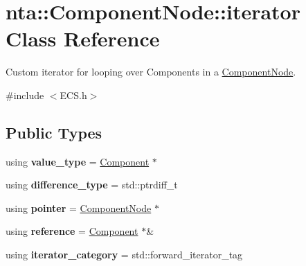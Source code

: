 \hypertarget{classnta_1_1ComponentNode_1_1iterator}{}\section{nta\+:\+:Component\+Node\+:\+:iterator Class Reference}
\label{classnta_1_1ComponentNode_1_1iterator}


Custom iterator for looping over Components in a \hyperlink{structnta_1_1ComponentNode}{Component\+Node}.  




{\ttfamily \#include $<$E\+C\+S.\+h$>$}

\subsection*{Public Types}
\begin{DoxyCompactItemize}
\item 
\mbox{\label{classnta_1_1ComponentNode_1_1iterator_a069cb5918a7ebfbc37af0386e66ff3c0}} 
using {\bfseries value\+\_\+type} = \hyperlink{classnta_1_1Component}{Component} $\ast$
\item 
\mbox{\label{classnta_1_1ComponentNode_1_1iterator_abcd9c1a5a2386266a22f81a6f0ce49aa}} 
using {\bfseries difference\+\_\+type} = std\+::ptrdiff\+\_\+t
\item 
\mbox{\label{classnta_1_1ComponentNode_1_1iterator_a855d605d35da2a160723602c4014c5f3}} 
using {\bfseries pointer} = \hyperlink{structnta_1_1ComponentNode}{Component\+Node} $\ast$
\item 
\mbox{\label{classnta_1_1ComponentNode_1_1iterator_a0b6b84e7ecf387c31b1d3e6e3eb2030f}} 
using {\bfseries reference} = \hyperlink{classnta_1_1Component}{Component} $\ast$\&
\item 
\mbox{\label{classnta_1_1ComponentNode_1_1iterator_a0277b407044773e3dc937b9d270819d2}} 
using {\bfseries iterator\+\_\+category} = std\+::forward\+\_\+iterator\+\_\+tag
\end{DoxyCompactItemize}
